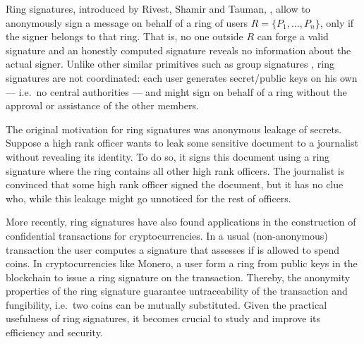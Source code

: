 
Ring signatures, introduced by Rivest, Shamir and Tauman, \cite{AC:RivShaTau01}, allow to anonymously sign a message on behalf of a ring of users $R=\{P_1,\ldots,P_n\}$, only if the signer belongs to that ring. That is, no one outside $R$ can forge a valid signature and  an honestly computed signature reveals no information about the actual signer.  
Unlike other similar primitives such as group signatures \cite{EC:ChaVan91}, ring signatures are not coordinated: each user generates secret/public keys on his own --- i.e.~no central authorities --- and might sign on behalf of a ring without the approval or assistance of the other members.

The original motivation for ring signatures was anonymous leakage of secrets. Suppose a high rank officer wants to leak some sensitive document to a journalist without revealing its identity. To do so, it signs this document using a ring signature where the ring contains all other high rank officers. The journalist is convinced that some high rank officer signed the document, but it has no clue who, while this leakage might go unnoticed for the rest of officers.

More recently, ring signatures have also found applications in the construction of confidential transactions for cryptocurrencies. In a usual (non-anonymous) transaction the user computes a signature that assesses if is allowed to spend coins. In cryptocurrencies like Monero, a user form a ring from public keys in the blockchain to issue a ring signature on the transaction. Thereby, the anonymity properties of the ring signature guarantee untraceability of the transaction and fungibility, i.e.~two coins can be mutually substituted.
Given the practical usefulness of ring signatures, it becomes crucial to study and improve its efficiency and security.

